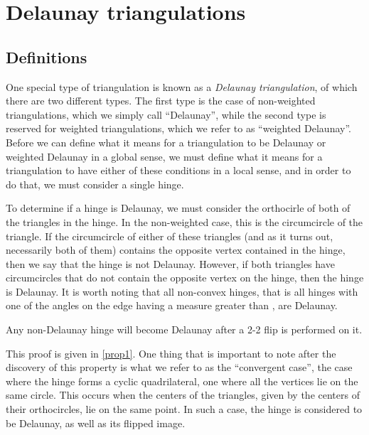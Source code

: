 \documentclass[12pt]{article}
\begin{document}
\section{Delaunay triangulations}
\label{DT}

\subsection{Definitions}
\label{DTD}

\noindent One special type of triangulation is known as a \textit{Delaunay triangulation}, of which there are two different types. The first type is the case of non-weighted triangulations, which we simply call ``Delaunay'', while the second type is reserved for weighted triangulations, which we refer to as ``weighted Delaunay''. Before we can define what it means for a triangulation to be Delaunay or weighted Delaunay in a global sense, we must define what it means for a triangulation to have either of these conditions in a local sense, and in order to do that, we must consider a single hinge.\newline

\noindent To determine if a hinge is Delaunay, we must consider the orthocirle of both of the triangles in the hinge. In the non-weighted case, this is the circumcircle of the triangle. If the circumcircle of either of these triangles (and as it turns out, necessarily both of them) contains the opposite vertex contained in the hinge, then we say that the hinge is not Delaunay. However, if both triangles have circumcircles that do not contain the opposite vertex on the hinge, then the hinge is Delaunay. It is worth noting that all non-convex hinges, that is all hinges with one of the angles on the edge having a measure greater than \pi, are Delaunay.\newline

\begin{proposition}
Any non-Delaunay hinge will become Delaunay after a 2-2 flip is performed on it.
\end{proposition}

\noindent This proof is given in \ref{prop1}. One thing that is important to note after the discovery of this property is what we refer to as the ``convergent case'', the case where the hinge forms a cyclic quadrilateral, one where all the vertices lie on the same circle. This occurs when the centers of the triangles, given by the centers of their orthocircles, lie on the same point. In such a case, the hinge is considered to be Delaunay, as well as its flipped image.\newline
\end{document}
